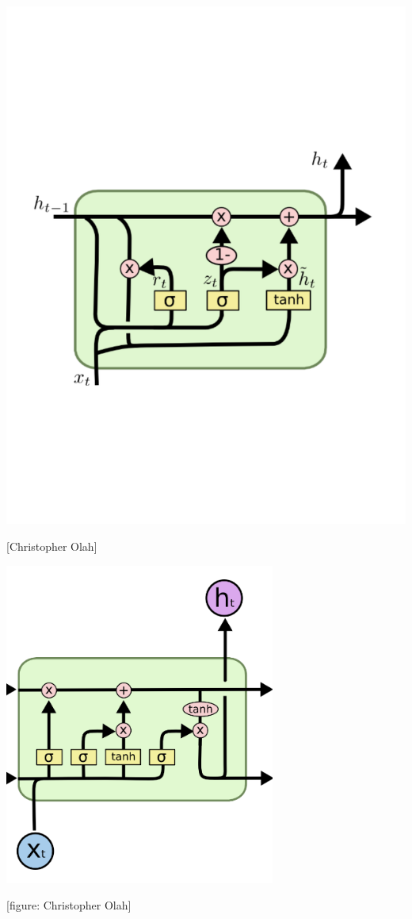 {

\centerline{\includegraphics[width=6.0in]{../images/GRU}}
\centerline{{\huge [Christopher Olah]}}

\centerline{\includegraphics[width=3.5in]{../images/LSTM}}
\centerline{{\large [figure: Christopher Olah]}}

}
